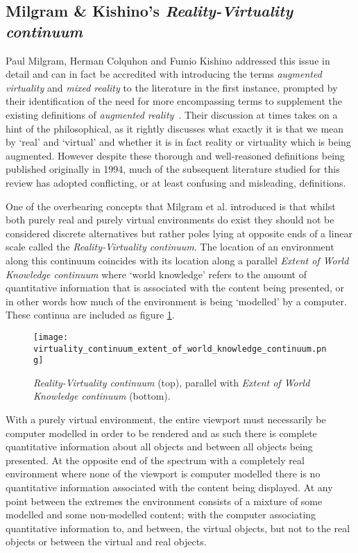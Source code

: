 \subsection{Milgram \& Kishino's \textit{Reality-Virtuality continuum}}

Paul Milgram, Herman Colquhon and Fumio Kishino addressed this issue in detail and can in fact be accredited with introducing the terms \textit{augmented virtuality} and \textit{mixed reality} to the literature in the first instance, prompted by their identification of the need for more encompassing terms to supplement the existing definitions of \textit{augmented reality}~\cite{Milgram1994, Milgram1999}. Their discussion at times takes on a hint of the philosophical, as it rightly discusses what exactly it is that we mean by `real' and `virtual' and whether it is in fact reality or virtuality which is being augmented. However despite these thorough and well-reasoned definitions being published originally in 1994, much of the subsequent literature studied for this review has adopted conflicting, or at least confusing and misleading, definitions.

One of the overbearing concepts that Milgram et al. introduced is that whilst both purely real and purely virtual environments do exist they should not be considered discrete alternatives but rather poles lying at opposite ends of a linear scale called the \textit{Reality-Virtuality continuum}. The location of an environment along this continuum coincides with its location along a parallel \textit{Extent of World Knowledge continuum} where `world knowledge' refers to the amount of quantitative information that is associated with the content being presented, or in other words how much of the environment is being `modelled' by a computer. These continua are included as figure \ref{reality_virtuality_extent_of_world_knowledge_continuum}.

\begin{figure}[h]
\centering
\texttt{[image: virtuality\_continuum\_extent\_of\_world\_knowledge\_continuum.png]}
\caption{\textit{Reality-Virtuality continuum} (top), parallel with \textit{Extent of World Knowledge continuum} (bottom).}
\label{reality_virtuality_extent_of_world_knowledge_continuum}
\end{figure}

With a purely virtual environment, the entire viewport must necessarily be computer modelled in order to be rendered and as such there is complete quantitative information about all objects and between all objects being presented. At the opposite end of the spectrum with a completely real environment where none of the viewport is computer modelled there is no quantitative information associated with the content being displayed. At any point between the extremes the environment consists of a mixture of some modelled and some non-modelled content; with the computer associating quantitative information to, and between, the virtual objects, but not to the real objects or between the virtual and real objects.

